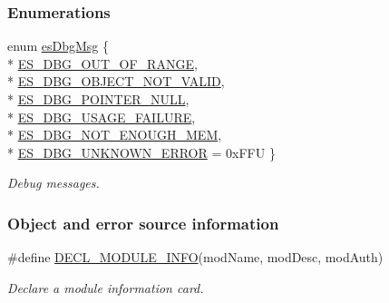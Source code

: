 \subsubsection*{Enumerations}
\begin{DoxyCompactItemize}
\item 
enum \hyperlink{group__dbg__intf_ga571a5933b00f4fdc98d1885a6b0f4613}{es\-Dbg\-Msg} \{ \\*
\hyperlink{group__dbg__intf_gga571a5933b00f4fdc98d1885a6b0f4613a0ed2560c05255d9ec7fbc8a615679b8f}{E\-S\-\_\-\-D\-B\-G\-\_\-\-O\-U\-T\-\_\-\-O\-F\-\_\-\-R\-A\-N\-G\-E}, 
\\*
\hyperlink{group__dbg__intf_gga571a5933b00f4fdc98d1885a6b0f4613a9c436de3c9447cf78f5bb979d8eaacb3}{E\-S\-\_\-\-D\-B\-G\-\_\-\-O\-B\-J\-E\-C\-T\-\_\-\-N\-O\-T\-\_\-\-V\-A\-L\-I\-D}, 
\\*
\hyperlink{group__dbg__intf_gga571a5933b00f4fdc98d1885a6b0f4613a5d5958107ab6f5e98e71edd70fc6ee68}{E\-S\-\_\-\-D\-B\-G\-\_\-\-P\-O\-I\-N\-T\-E\-R\-\_\-\-N\-U\-L\-L}, 
\\*
\hyperlink{group__dbg__intf_gga571a5933b00f4fdc98d1885a6b0f4613af13d39124e0d44b1dd10af1cf4a5c071}{E\-S\-\_\-\-D\-B\-G\-\_\-\-U\-S\-A\-G\-E\-\_\-\-F\-A\-I\-L\-U\-R\-E}, 
\\*
\hyperlink{group__dbg__intf_gga571a5933b00f4fdc98d1885a6b0f4613a108434c02714d8cd87822f04e41979b8}{E\-S\-\_\-\-D\-B\-G\-\_\-\-N\-O\-T\-\_\-\-E\-N\-O\-U\-G\-H\-\_\-\-M\-E\-M}, 
\\*
\hyperlink{group__dbg__intf_gga571a5933b00f4fdc98d1885a6b0f4613ad073b50d452e7cd23ca27463c90ae8f2}{E\-S\-\_\-\-D\-B\-G\-\_\-\-U\-N\-K\-N\-O\-W\-N\-\_\-\-E\-R\-R\-O\-R} = 0x\-F\-F\-U
 \}
\begin{DoxyCompactList}\small\item\em Debug messages. \end{DoxyCompactList}\end{DoxyCompactItemize}
\subsubsection*{Object and error source information}
\begin{DoxyCompactItemize}
\item 
\#define \hyperlink{group__dbg__intf_ga94eccf7c06c7ddd4516b8b6844666be5}{D\-E\-C\-L\-\_\-\-M\-O\-D\-U\-L\-E\-\_\-\-I\-N\-F\-O}(mod\-Name, mod\-Desc, mod\-Auth)
\begin{DoxyCompactList}\small\item\em Declare a module information card. \end{DoxyCompactList}\end{DoxyCompactItemize}
